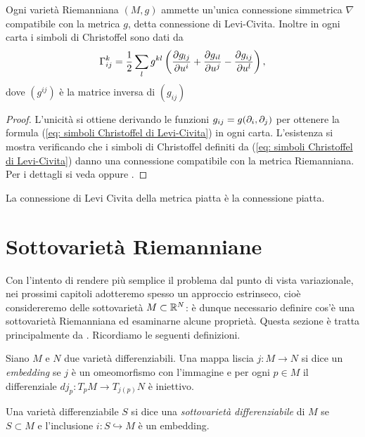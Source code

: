 	\begin{teo}
		Ogni varietà Riemanniana \((M,g)\) ammette un'unica connessione simmetrica \(\nabla\) compatibile con la metrica \(g\), detta connessione di Levi-Civita. Inoltre in ogni carta i simboli di Christoffel sono dati da
		\begin{equation}\label{eq: simboli Christoffel di Levi-Civita}
		\Gamma_{ij}^k = \frac{1}{2} \sum_l g^{kl}\left( \frac{\partial g_{lj}}{\partial u^i} + \frac{\partial g_{il}}{\partial u^j} - \frac{\partial g_{ij}}{\partial u^l} \right),
		\end{equation}
		dove \((g^{ij})\) è la matrice inversa di \((g_{ij})\)
	\end{teo}
	\begin{proof}
		L'unicità si ottiene derivando le funzioni \(g_{ij} = g(\partial_i,\partial_j)\) per ottenere la formula (\ref{eq: simboli Christoffel di Levi-Civita}) in ogni carta. L'esistenza si mostra verificando che i simboli di Christoffel definiti da (\ref{eq: simboli Christoffel di Levi-Civita}) danno una connessione compatibile con la metrica Riemanniana. Per i dettagli si veda \cite[Teorema~6.6.6]{abate2011geometria} oppure \cite[Lemma~8.6]{milnor1963morse}.
	\end{proof}
	\begin{es}
		La connessione di Levi Civita della metrica piatta è la connessione piatta.
	\end{es}

	
\section{Sottovarietà Riemanniane}\label{sez: sottovarietà}
	
	Con l'intento di rendere più semplice il problema dal punto di vista variazionale, nei prossimi capitoli adotteremo spesso un approccio estrinseco, cioè considereremo delle sottovarietà \(M \subset \mathbb{R}^N\): è dunque necessario definire cos'è una sottovarietà Riemanniana ed esaminarne alcune proprietà. Questa sezione è tratta principalmente da \cite[Section~8.1]{lee1997riemannian}. Ricordiamo le seguenti definizioni.
	\begin{defi}
		Siano \(M\) e \(N\) due varietà differenziabili. Una mappa liscia \(j:M \to N\) si dice un \textit{embedding} se \(j\) è un omeomorfismo con l'immagine e per ogni \(p \in M\) il differenziale \(dj_p:T_pM \to T_{j(p)}N\) è iniettivo.
	\end{defi}
	
	\begin{defi}
		Una varietà differenziabile \(S\) si dice una \textit{sottovarietà differenziabile} di \(M\) se \(S \subset M\) e l'inclusione \(i:S \hookrightarrow M\) è un embedding. 
	\end{defi} 
	
